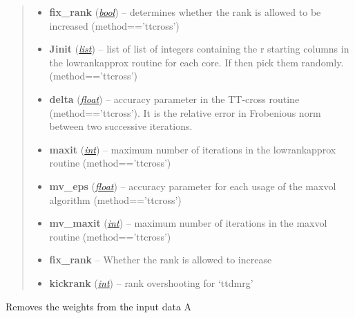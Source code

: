 \documentclass[a4paper,10pt,english]{sphinxmanual}
\begin{document}
\begin{fulllineitems}
\begin{fulllineitems}
\begin{quote}
\begin{description}
\begin{itemize}
\item {} 
\textbf{fix\_rank} (\href{http://docs.python.org/library/functions.html\#bool}{\emph{bool}}) -- determines whether the rank is allowed to be increased (method=='ttcross')

\item {} 
\textbf{Jinit} (\href{http://docs.python.org/library/functions.html\#list}{\emph{list}}) -- list of list of integers containing the r starting columns in the lowrankapprox routine for each core. If  then pick them randomly. (method=='ttcross')

\item {} 
\textbf{delta} (\href{http://docs.python.org/library/functions.html\#float}{\emph{float}}) -- accuracy parameter in the TT-cross routine (method=='ttcross'). It is the relative error in Frobenious norm between two successive iterations.

\item {} 
\textbf{maxit} (\href{http://docs.python.org/library/functions.html\#int}{\emph{int}}) -- maximum number of iterations in the lowrankapprox routine (method=='ttcross')

\item {} 
\textbf{mv\_eps} (\href{http://docs.python.org/library/functions.html\#float}{\emph{float}}) -- accuracy parameter for each usage of the maxvol algorithm (method=='ttcross')

\item {} 
\textbf{mv\_maxit} (\href{http://docs.python.org/library/functions.html\#int}{\emph{int}}) -- maximum number of iterations in the maxvol routine (method=='ttcross')

\item {} 
\textbf{fix\_rank} -- Whether the rank is allowed to increase

\item {} 
\textbf{kickrank} (\href{http://docs.python.org/library/functions.html\#int}{\emph{int}}) -- rank overshooting for `ttdmrg'

\end{itemize}

\end{description}\end{quote}

\end{fulllineitems}


\begin{fulllineitems}
\label{api-core:TensorToolbox.core.WTTvec.remove_weights_from_data}
Removes the weights from the input data A

\end{fulllineitems}


\end{fulllineitems}
\end{document}
